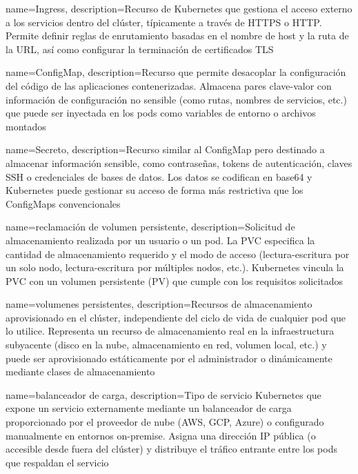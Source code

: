 {
    name={Ingress},
    description={Recurso de Kubernetes que gestiona el acceso externo a los servicios dentro del clúster, típicamente a través de \ac{HTTPS} o \ac{HTTP}. Permite definir reglas de enrutamiento basadas en el nombre de host y la ruta de la URL, así como configurar la terminación de certificados \ac{TLS} \citep{kubernetes2025ingress}}
}

{
    name={ConfigMap},
    description={Recurso que permite desacoplar la configuración del código de las aplicaciones contenerizadas. Almacena pares clave-valor con información de configuración no sensible (como rutas, nombres de servicios, etc.) que puede ser inyectada en los pods como variables de entorno o archivos montados \citep{kubernetes2025configmap}}
}

{
    name={Secreto},
    description={Recurso similar al ConfigMap pero destinado a almacenar información sensible, como contraseñas, tokens de autenticación, claves SSH o credenciales de bases de datos. Los datos se codifican en base64 y Kubernetes puede gestionar su acceso de forma más restrictiva que los ConfigMaps convencionales \citep{kubernetes2025secrets}}
}

{
    name={reclamación de volumen persistente},
    description={Solicitud de almacenamiento realizada por un usuario o un pod. La PVC especifica la cantidad de almacenamiento requerido y el modo de acceso (lectura-escritura por un solo nodo, lectura-escritura por múltiples nodos, etc.). Kubernetes vincula la PVC con un volumen persistente (PV) que cumple con los requisitos solicitados \citep{kubernetes2025pvc}}
}

{
    name={volumenes persistentes},
    description={Recursos de almacenamiento aprovisionado en el clúster, independiente del ciclo de vida de cualquier pod que lo utilice. Representa un recurso de almacenamiento real en la infraestructura subyacente (disco en la nube, almacenamiento en red, volumen local, etc.) y puede ser aprovisionado estáticamente por el administrador o dinámicamente mediante clases de almacenamiento \citep{kubernetes2025pv}}
}

{
    name={balanceador de carga},
    description={Tipo de servicio Kubernetes que expone un servicio externamente mediante un balanceador de carga proporcionado por el proveedor de nube (AWS, GCP, Azure) o configurado manualmente en entornos on-premise. Asigna una dirección IP pública (o accesible desde fuera del clúster) y distribuye el tráfico entrante entre los pods que respaldan el servicio \citep{kubernetes2025loadbalancer}}
}


